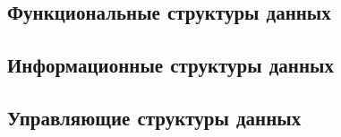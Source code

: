 ﻿%
\subsection{Функциональные структуры данных}
\begin{frame}


\end{frame}
\subsection{Информационные структуры данных}
\begin{frame}
\end{frame}
\subsection{Управляющие структуры данных}
\begin{frame}


\end{frame}

